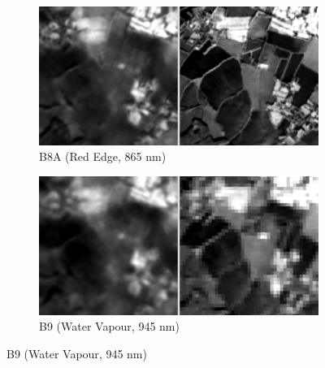 \begin{figure}[p]
    \vspace{0.5em}
    \begin{subfigure}{0.48\textwidth}
        \centering
        \includegraphics[width=\linewidth]{img/bands_gray/sample_000008_B09_panel.png}
        \caption{B8A (Red Edge, 865 nm)}
    \end{subfigure}\hfill
    \begin{subfigure}{0.48\textwidth}
        \centering
        \includegraphics[width=\linewidth]{img/bands_gray/sample_000008_B10_panel.png}
        \caption{B9 (Water Vapour, 945 nm)}
    \end{subfigure}


\end{figure}
